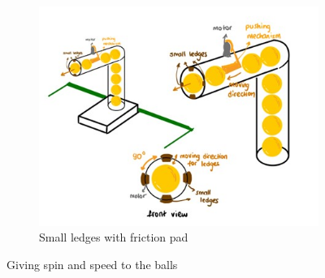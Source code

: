 \documentclass[12pt]{article}
\begin{document}
\begin{figure}[H]
\begin{subfigure}{.5\textwidth}
  \centering
  \includegraphics[width=.4\linewidth]{Small legdes with friction pad.jpg}
  \caption{Small ledges with friction pad}
  \label{fig:ledges}
\end{subfigure}%
\begin{subfigure}{.5\textwidth}
  \centering
  
  \label{fig:spins}
\end{subfigure}%


\caption{Giving spin and speed to the balls  }
\label{fig:test}
\end{figure}
\end{document}

